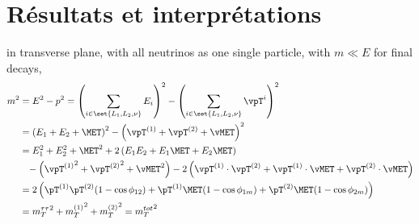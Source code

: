 \section{Résultats et interprétations}\label{chapter-HTT_analysis-section-results}


in transverse plane,
with all neutrinos as one single particle,
with $m\ll E$ for final decays,
\begin{align}
m^2 &= E^2 - p^2
= \left( \sum_{i \in \set{L_1,L_2,\nu}} E_i \right)^2 - \left( \sum_{i \in \set{L_1,L_2,\nu}} \vpT^i \right)^2\\
&= \left( E_1 + E_2 + \MET \right)^2 - \left( \vpT^{(1)} + \vpT^{(2)} + \vMET \right)^2\\
&= E_1^2 + E_2^2 + \MET^2 + 2 \left( E_1E_2 + E_1\MET + E_2\MET \right)\\
&\hphantom{=} - \left( {\vpT^{(1)}}^2 + {\vpT^{(2)}}^2 + {\vMET}^2 \right) - 2 \left( \vpT^{(1)}\cdot\vpT^{(2)} + \vpT^{(1)}\cdot\vMET + \vpT^{(2)}\cdot\vMET \right)\\
&= 2 \left( \pT^{(1)}\pT^{(2)}(1-\cos\phi_{12}) + \pT^{(1)}\MET(1-\cos\phi_{1m}) + \pT^{(2)}\MET(1-\cos\phi_{2m}) \right)\\
&= {m_T^{\tau\tau}}^2 + {m_T^{(1)}}^2 + {m_T^{(2)}}^{2} = {m_T^{tot}}^2
\end{align}